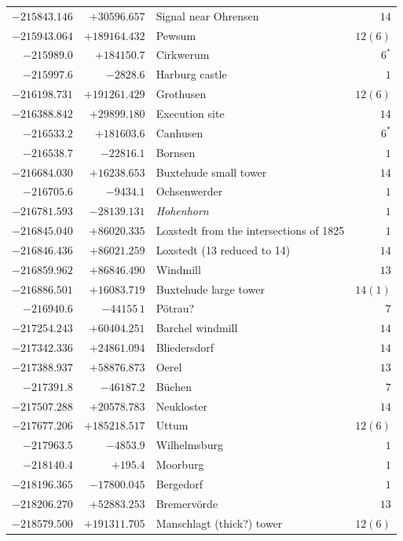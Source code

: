 \begin{center}
\begin{tabular}{r|r|p{170pt}|r}
\(-215843.146\)&\(+30596.657\)&Signal near Ohrensen&\(14\)\\
\(-215943.064\)&\(+189164.432\)&Pewsum&\(12 (6)\)\\
\(-215989.0\)&\(+184150.7\)&Cirkwerum&\(6^{*}\)\\
\(-215997.6\)&\(-2828.6\)&Harburg castle&\(1\)\\
\(-216198.731\)&\(+191261.429\)&Grothusen&\(12 (6)\)\\
\(-216388.842\)&\(+29899.180\)&Execution site&\(14\)\\
\(-216533.2\)&\(+181603.6\)&Canhusen&\(6^{*}\)\\
\(-216538.7\)&\(-22816.1\)&Bornsen&\(1\)\\
\(-216684.030\)&\(+16238.653\)&Buxtehude small tower&\(14\)\\
\(-216705.6\)&\(-9434.1\)&Ochsenwerder&\(1\)\\
\(-216781.593\)&\(-28139.131\)&\textit{Hohenhorn}&\(1\)\\
\(-216845.040\)&\(+86020.335\)&Loxstedt from the intersections of 1825&\(1\)\\
\(-216846.436\)&\(+86021.259\)&Loxstedt (13 reduced to 14)&\(14\)\\
\(-216859.962\)&\(+86846.490\)&Windmill&\(13\)\\
\(-216886.501\)&\(+16083.719\)&Buxtehude large tower&\(14 (1)\)\\
\(-216940.6\)&\(-44155\,1\)&Pötrau?&\(7\)\\
\(-217254.243\)&\(+60404.251\)&Barchel windmill&\(14\)\\
\(-217342.336\)&\(+24861.094\)&Bliedersdorf&\(14\)\\
\(-217388.937\)&\(+58876.873\)&Oerel&\(13\)\\
\(-217391.8\)&\(-46187.2\)&Büchen&\(7\)\\
\(-217507.288\)&\(+20578.783\)&Neukloster&\(14\)\\
\(-217677.206\)&\(+185218.517\)&Uttum&\(12 (6)\)\\
\(-217963.5\)&\(-4853.9\)&Wilhelmsburg&\(1\)\\
\(-218140.4\)&\(+195.4\)&Moorburg&\(1\)\\
\(-218196.365\)&\(-17800.045\)&Bergedorf&\(1\)\\
\(-218206.270\)&\(+52883.253\)&Bremervörde&\(13\)\\
\(-218579.500\)&\(+191311.705\)&Manschlagt (thick?) tower&\(12 (6)\)\\
\hline\end{tabular}\endgroup\end{center}
